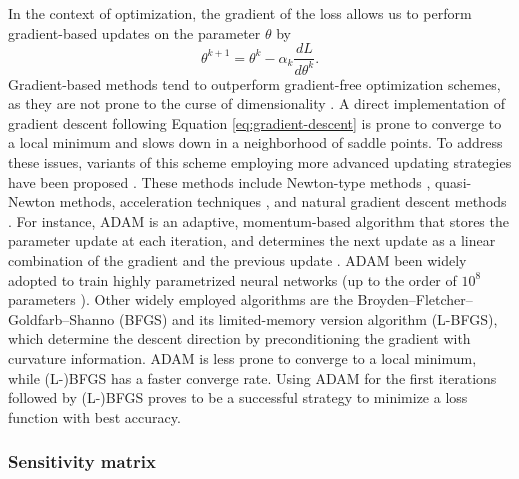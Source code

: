 In the context of optimization, the gradient of the loss allows us to perform gradient-based updates on the parameter $\theta$ by 
\begin{equation}\label{eq:gradient-descent}
    \theta^{k+1} 
    = 
    \theta^k 
    - 
    \alpha_k 
    \frac{dL}{d\theta^k}.
\end{equation}
Gradient-based methods tend to outperform gradient-free optimization schemes, as they are not prone to the curse of dimensionality \cite{Schartau2017}. 
A direct implementation of gradient descent following Equation \eqref{eq:gradient-descent} is prone to converge to a local minimum and slows down in a neighborhood of saddle points. 
To address these issues, variants of this scheme employing more advanced updating strategies have been proposed \cite{ruder2016overview-gradient-descent}.
These methods include Newton-type methods \cite{second-order-optimization}, quasi-Newton methods, acceleration techniques \cite{JMLR:v22:20-207}, and natural gradient descent methods \cite{doi:10.1137/22M1477805}. 
For instance, ADAM is an adaptive, momentum-based algorithm  that stores the parameter update at each iteration, and determines the next update as a linear combination of the gradient and the previous update \cite{Kingma2014}.
ADAM been widely adopted to train highly parametrized neural networks (up to the order of $10^8$ parameters \cite{NIPS2017_3f5ee243}).
Other widely employed algorithms are the Broyden–Fletcher–Goldfarb–Shanno (BFGS) and its limited-memory version algorithm (L-BFGS), which determine the descent direction by preconditioning the gradient with curvature information. 
ADAM is less prone to converge to a local minimum, while (L-)BFGS has a faster converge rate. 
Using ADAM for the first iterations followed by (L-)BFGS proves to be a successful strategy to minimize a loss function with best accuracy. 

% 

\subsubsection{Sensitivity matrix}


